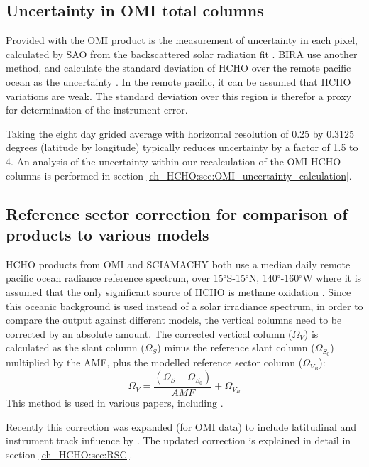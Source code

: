   \subsection{Uncertainty in OMI total columns}
  \label{ch_HCHO:sec:OMIuncertainty}
    Provided with the OMI product is the measurement of uncertainty in each pixel, calculated by SAO from the backscattered solar radiation fit \citep{Abad2015,Abad2016}.
    BIRA use another method, and calculate the standard deviation of HCHO over the remote pacific ocean as the uncertainty 
    \citep{DeSmedt2012, DeSmedt2015}.
    In the remote pacific, it can be assumed that HCHO variations are weak.
    The standard deviation over this region is therefor a proxy for determination of the instrument error.
    
    Taking the eight day grided average with horizontal resolution of 0.25 by 0.3125 degrees (latitude by longitude) typically reduces uncertainty by a factor of 1.5 to 4.
    An analysis of the uncertainty within our recalculation of the OMI HCHO columns is performed in section \ref{ch_HCHO:sec:OMI_uncertainty_calculation}.
      
  \subsection{Reference sector correction for comparison of products to various models}
    HCHO products from OMI and SCIAMACHY both use a median daily remote pacific ocean radiance reference spectrum, over 15$^{\circ}$S-15$^{\circ}$N, 140$^{\circ}$-160$^{\circ}$W where it is assumed that the only significant source of HCHO is methane oxidation \citep{DeSmedt2008,Barkley2013,Kurosu2014}.
    Since this oceanic background is used instead of a solar irradiance spectrum, in order to compare the output against different models, the vertical columns need to be corrected by an absolute amount.
    The corrected vertical column ($\Omega_V$) is calculated as the slant column ($\Omega_S$) minus the reference slant column ($\Omega_{S_0}$) multiplied by the AMF, plus the modelled reference sector column ($\Omega_{V_B}$):
    \begin{equation*}
      \Omega_V = \frac{ \left( \Omega_S - \Omega_{S_0} \right) }{ AMF } + \Omega_{V_B}
    \end{equation*}
    This method is used in various papers, including \citet{DeSmedt2008, DeSmedt2012, DeSmedt2015, Barkley2013, Bauwens2016}.
    
    Recently this correction was expanded (for OMI data) to include latitudinal and instrument track influence by \citet{Abad2015}.
    The updated correction is explained in detail in section \ref{ch_HCHO:sec:RSC}.
    
